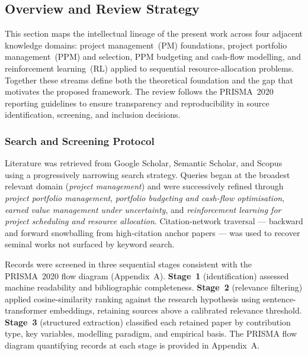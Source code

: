 
\subsection{Overview and Review Strategy}
\label{subsec:lr_overview}

This section maps the intellectual lineage of the present work across four
adjacent knowledge domains: project management~(PM) foundations, project
portfolio management~(PPM) and selection, PPM budgeting and cash-flow
modelling, and reinforcement learning~(RL) applied to sequential
resource-allocation problems. Together these streams define both the
theoretical foundation and the gap that motivates the proposed framework.
The review follows the PRISMA~2020 reporting guidelines
\citep{Page2021} to ensure transparency and reproducibility in source
identification, screening, and inclusion decisions.

\subsubsection{Search and Screening Protocol}
\label{subsubsec:prisma}

Literature was retrieved from Google Scholar, Semantic Scholar, and Scopus
using a progressively narrowing search strategy. Queries began at the broadest
relevant domain (\emph{project management}) and were successively refined
through \emph{project portfolio management}, \emph{portfolio budgeting and
cash-flow optimisation}, \emph{earned value management under uncertainty}, and
\emph{reinforcement learning for project scheduling and resource allocation}.
Citation-network traversal --- backward and forward snowballing from
high-citation anchor papers --- was used to recover seminal works not surfaced
by keyword search.

Records were screened in three sequential stages consistent with the PRISMA~2020
flow diagram (Appendix~A). \textbf{Stage~1} (identification) assessed machine
readability and bibliographic completeness. \textbf{Stage~2} (relevance
filtering) applied cosine-similarity ranking against the research hypothesis
using sentence-transformer embeddings, retaining sources above a calibrated
relevance threshold. \textbf{Stage~3} (structured extraction) classified each
retained paper by contribution type, key variables, modelling paradigm, and
empirical basis. The PRISMA flow diagram quantifying records at each stage is
provided in Appendix~A.

